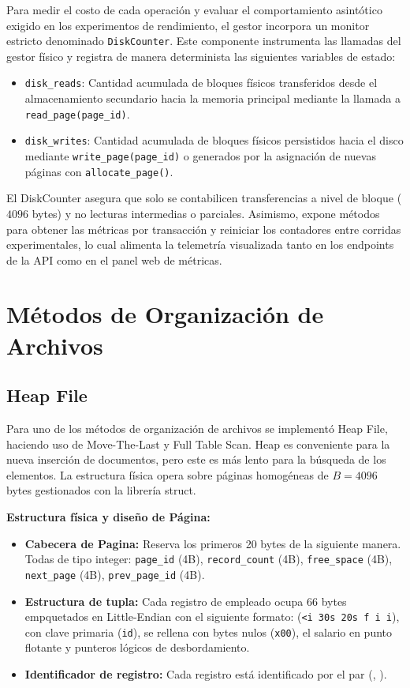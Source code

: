 \documentclass[a4paper,12pt]{article}
\begin{document}
Para medir el costo de cada operación y evaluar el comportamiento asintótico exigido en los experimentos de rendimiento, el gestor incorpora un monitor estricto denominado \texttt{DiskCounter}. Este componente instrumenta las llamadas del gestor físico y registra de manera determinista las siguientes variables de estado:

\begin{itemize}
    \item \texttt{disk\_reads}: Cantidad acumulada de bloques físicos transferidos desde el almacenamiento secundario hacia la memoria principal mediante la llamada a \texttt{read\_page(page\_id)}.
    \item \texttt{disk\_writes}: Cantidad acumulada de bloques físicos persistidos hacia el disco mediante \texttt{write\_page(page\_id)} o generados por la asignación de nuevas páginas con \texttt{allocate\_page()}.
\end{itemize}

El DiskCounter asegura que solo se contabilicen transferencias a nivel de bloque ($4096$ bytes) y no lecturas intermedias o parciales. Asimismo, expone métodos para obtener las métricas por transacción y reiniciar los contadores entre corridas experimentales, lo cual alimenta la telemetría visualizada tanto en los endpoints de la API como en el panel web de métricas.

\section{Métodos de Organización de Archivos}
\subsection{Heap File}
Para uno de los métodos de organización de archivos se implementó Heap File, haciendo uso de Move-The-Last y Full Table Scan. Heap es conveniente para la nueva inserción de documentos, pero este es más lento para la búsqueda de los elementos. La estructura física opera sobre páginas homogéneas de $B = 4096$ bytes gestionados con la librería struct.


\textbf{Estructura física y diseño de Página:}


\begin{itemize}
    \item \textbf{Cabecera de Pagina:} Reserva los primeros 20 bytes de la siguiente manera. Todas de tipo integer: \texttt{page\_id} (4B), \texttt{record\_count} (4B), \texttt{free\_space} (4B), \texttt{next\_page} (4B), \texttt{prev\_page\_id} (4B).
    \item \textbf{Estructura de tupla:} Cada registro de empleado ocupa 66 bytes empquetados en Little-Endian con el siguiente formato: (\texttt{<i 30s 20s f i i}), con clave primaria (\texttt{id}), se rellena con bytes nulos (\texttt{x00}), el salario en punto flotante y punteros lógicos de desbordamiento.
    \item \textbf{Identificador de registro:} Cada registro está identificado por el par (, ).
\end{itemize}
\end{document}
